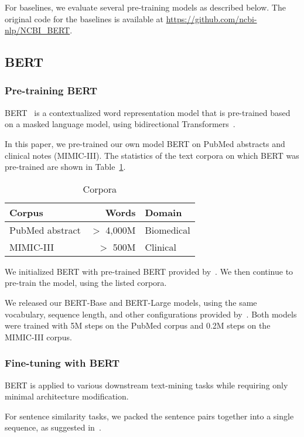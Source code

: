 \documentclass[11pt,a4paper]{article}
\begin{document}
For baselines, we evaluate several pre-training models as described below. The original code for the baselines is available at \url{https://github.com/ncbi-nlp/NCBI_BERT}.

\subsection{BERT}

\subsubsection{Pre-training BERT}

BERT~\cite{devlin2018bert} is a contextualized word representation model that is pre-trained based on a masked language model, using bidirectional Transformers~\cite{vaswani2017attentiona}.

In this paper, we pre-trained our own model BERT on PubMed abstracts and clinical notes (MIMIC-III). The statistics of the text corpora on which BERT was pre-trained are shown in Table~\ref{tab:corpora}.

\begin{table}[H]
\centering
\begin{tabular}{lrl}
\toprule
Corpus & Words & Domain\\
\midrule
PubMed abstract & $>$ 4,000M & Biomedical\\
MIMIC-III & $>$ 500M & Clinical\\
\bottomrule
\end{tabular}
\caption{Corpora}
\label{tab:corpora}
\end{table}

We initialized BERT with pre-trained BERT provided by~\cite{devlin2018bert}. We then continue to pre-train the model, using the listed corpora. 

We released our BERT-Base and BERT-Large models, using the same vocabulary, sequence length, and other configurations provided by~\citet{devlin2018bert}. Both models were trained with 5M steps on the PubMed corpus and 0.2M steps on the MIMIC-III corpus.

\subsubsection{Fine-tuning with BERT}

BERT is applied to various downstream text-mining tasks while requiring only minimal architecture modification. 

For sentence similarity tasks, we packed the sentence pairs together into a single sequence, as suggested in~\citet{devlin2018bert}.
\end{document}
